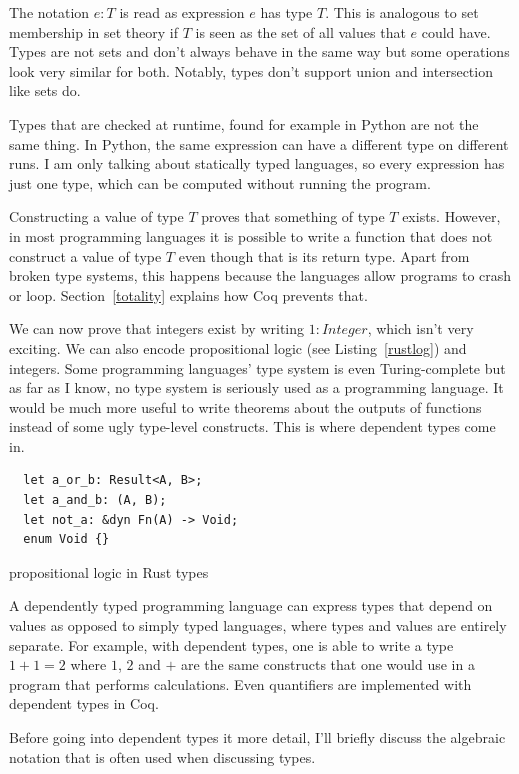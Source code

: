 \documentclass[english, 12pt, a4paper, sci, a-1b, online]{aaltothesis}
\begin{document}
The notation $e : T$ is read as expression $e$ has type $T$. This is analogous to set membership in set theory if $T$ is seen as the set of all values that $e$ could have. Types are not sets and don't always behave in the same way but some operations look very similar for both. Notably, types don't support union and intersection like sets do.

Types that are checked at runtime, found for example in Python are not the same thing. In Python, the same expression can have a different type on different runs. I am only talking about statically typed languages, so every expression has just one type, which can be computed without running the program.

Constructing a value of type $T$ proves that something of type $T$ exists. However, in most programming languages it is possible to write a function that does not construct a value of type $T$ even though that is its return type. Apart from broken type systems, this happens because the languages allow programs to crash or loop. Section~\ref{totality} explains how Coq prevents that.

We can now prove that integers exist by writing $1: Integer$, which isn't very exciting. We can also encode propositional logic (see Listing~\ref{rustlog}) and integers. Some programming languages' type system is even Turing-complete but as far as I know, no type system is seriously used as a programming language. It would be much more useful to write theorems about the outputs of functions instead of some ugly type-level constructs. This is where dependent types come in.

\begin{listing}[h]
  \begin{verbatim}
  let a_or_b: Result<A, B>;
  let a_and_b: (A, B);
  let not_a: &dyn Fn(A) -> Void;
  enum Void {}
  \end{verbatim}
  \caption{propositional logic in Rust types}
  \label{rustlog}
\end{listing}

A dependently typed programming language can express types that depend on values as opposed to simply typed languages, where types and values are entirely separate. For example, with dependent types, one is able to write a type $1 + 1 = 2$ where $1$, $2$ and $+$ are the same constructs that one would use in a program that performs calculations. Even quantifiers are implemented with dependent types in Coq.

Before going into dependent types it more detail, I'll briefly discuss the algebraic notation that is often used when discussing types.
\end{document}
